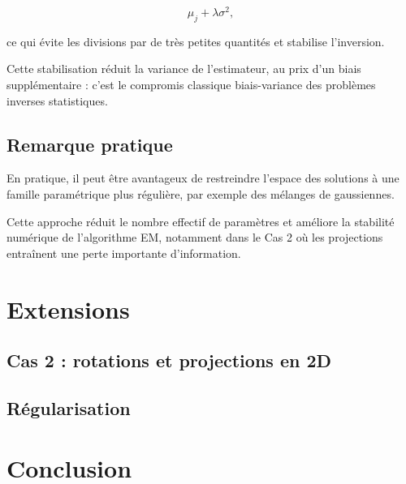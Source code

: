 \documentclass[12pt, a4paper]{article}
\theoremstyle{definition}
\begin{document}
\[
\mu_j+\lambda\sigma^2,
\]

ce qui évite les divisions par de très petites quantités et stabilise l’inversion.

Cette stabilisation réduit la variance de l’estimateur, au prix d’un biais supplémentaire : c’est le compromis classique biais-variance des problèmes inverses statistiques.


\subsection{Remarque pratique}

En pratique, il peut être avantageux de restreindre l’espace des solutions à une famille paramétrique plus régulière, par exemple des mélanges de gaussiennes.

Cette approche réduit le nombre effectif de paramètres et améliore la stabilité numérique de l’algorithme EM, notamment dans le Cas 2 où les projections entraînent une perte importante d’information.
%




\newpage
\section{Extensions}
\label{sec:extensions}

\subsection{Cas 2 : rotations et projections en 2D}
\label{subsec:cas2_extensions}

\subsection{Régularisation}
\label{subsec:regularisation}


\newpage
\section*{Conclusion}


\newpage


\end{document}
